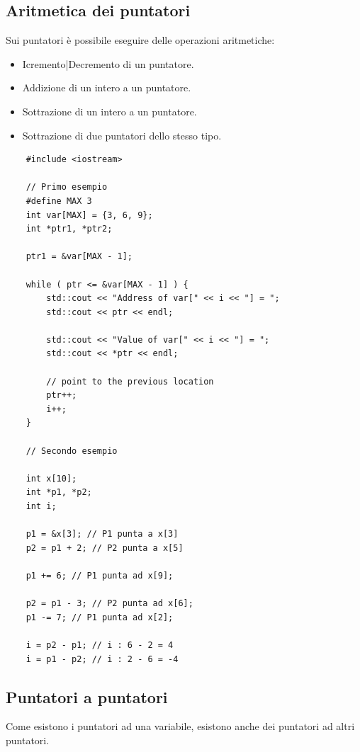 \subsection{Aritmetica dei puntatori}

\textsf{\small Sui puntatori è possibile eseguire delle operazioni aritmetiche:} \\

\begin{itemize}
	\item \textsf{\small Icremento|Decremento di un puntatore.}
	\item \textsf{\small Addizione di un intero a un puntatore.}
	\item \textsf{\small Sottrazione di un intero a un puntatore.}
	\item \textsf{\small Sottrazione di due puntatori dello stesso tipo.}
\end{itemize}

\begin{lstlisting}
	#include <iostream>
	
	// Primo esempio
	#define MAX 3
	int var[MAX] = {3, 6, 9};
	int *ptr1, *ptr2;
	
	ptr1 = &var[MAX - 1];
	
	while ( ptr <= &var[MAX - 1] ) {
		std::cout << "Address of var[" << i << "] = ";
		std::cout << ptr << endl;
		
		std::cout << "Value of var[" << i << "] = ";
		std::cout << *ptr << endl;
		
		// point to the previous location
		ptr++;
		i++;
	}
	
	// Secondo esempio
	
	int x[10];
	int *p1, *p2;
	int i;
	
	p1 = &x[3]; // P1 punta a x[3]
	p2 = p1 + 2; // P2 punta a x[5]
	
	p1 += 6; // P1 punta ad x[9];
	
	p2 = p1 - 3; // P2 punta ad x[6];
	p1 -= 7; // P1 punta ad x[2];
	
	i = p2 - p1; // i : 6 - 2 = 4
	i = p1 - p2; // i : 2 - 6 = -4
\end{lstlisting}

\subsection{Puntatori a puntatori}

\textsf{\small Come esistono i puntatori ad una variabile, esistono anche dei puntatori ad altri puntatori.} \\

